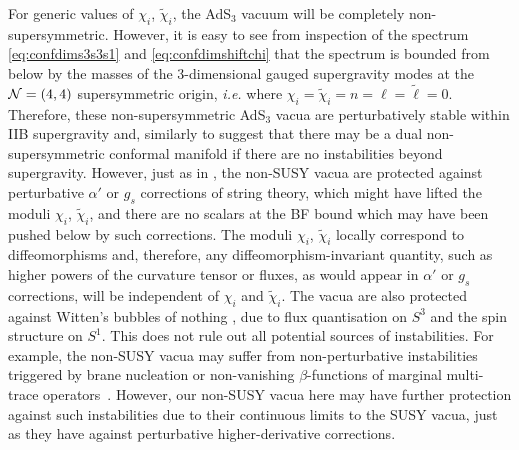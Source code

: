 \documentclass[a4paper, 11pt]{article}
\numberwithin{equation}{section}
\newcommand{\ts}[1]{\widetilde{#1}}
\newcommand{\+}{\oplus}
\begin{document}
For generic values of $\chi_i$, $\ts{\chi}_i$, the AdS$_3$ vacuum will be completely non-supersymmetric. However, it is easy to see from inspection of the spectrum \eqref{eq:confdims3s3s1} and \eqref{eq:confdimshiftchi} that the spectrum is bounded from below by the masses of the 3-dimensional gauged supergravity modes at the ${\cal N}=(4,4)$ supersymmetric origin, \textit{i.e.} where $\chi_i = \ts{\chi}_i = n = \ell = \ts{\ell} = 0$. Therefore, these non-supersymmetric AdS$_3$ vacua are perturbatively stable within IIB supergravity and, similarly to \cite{Giambrone:2021wsm} suggest that there may be a dual non-supersymmetric conformal manifold if there are no instabilities beyond supergravity. However, just as in \cite{Giambrone:2021wsm}, the non-SUSY vacua are protected against perturbative $\alpha'$ or $g_s$ corrections of string theory, which might have lifted the moduli $\chi_i$, $\ts{\chi}_i$, and there are no scalars at the BF bound which may have been pushed below by such corrections. The moduli $\chi_i$, $\ts{\chi}_i$ locally correspond to diffeomorphisms and, therefore, any diffeomorphism-invariant quantity, such as higher powers of the curvature tensor or fluxes, as would appear in $\alpha'$ or $g_s$ corrections, will be independent of $\chi_i$ and $\ts{\chi}_i$. The vacua are also protected against Witten's bubbles of nothing \cite{Witten:1981gj}, due to flux quantisation on $S^3$ and the spin structure on $S^1$. This does not rule out all potential sources of instabilities. For example, the non-SUSY vacua may suffer from non-perturbative instabilities triggered by brane nucleation \cite{Ooguri:2016pdq,Bomans:2021ara} or non-vanishing $\beta$-functions of marginal multi-trace operators~\cite{Witten:2001ua}. However, our non-SUSY vacua here may have further protection against such instabilities due to their continuous limits to the SUSY vacua, just as they have against perturbative higher-derivative corrections.
\end{document}
